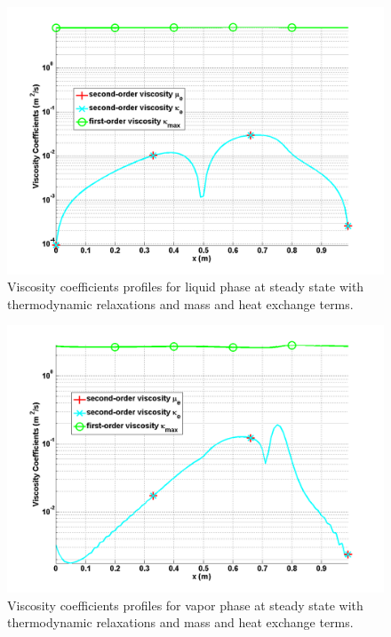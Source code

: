 \begin{figure}[H]
\centering
\includegraphics[width=\textwidth]{figures/SEM/Aint1e3MassOn_liquid_viscosity_kappa_mu.png}
\caption{Viscosity coefficients profiles for liquid phase at steady state with thermodynamic relaxations and mass and heat exchange terms.}
\label{fig:two-fluids-rel-nozzle-visc-liq-mass-on-sem-sect4}
\end{figure}
%
\begin{figure}[H]
\centering
\includegraphics[width=\textwidth]{figures/SEM/Aint1e3MassOn_vapor_viscosity_kappa_mu.png}
\caption{Viscosity coefficients profiles for vapor phase at steady state with thermodynamic relaxations and mass and heat exchange terms.}
\label{fig:two-fluids-rel-nozzle-visc-vap-mass-on-sem-sect4}
\end{figure}
